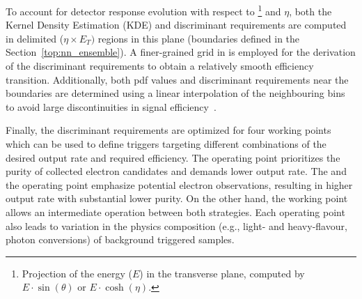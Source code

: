 To account for detector response evolution with
respect to \Et\footnote{Projection of the energy ($E$) in the transverse plane,
computed by $E\cdot\sin(\theta)$ or $E\cdot\cosh(\eta)$.} and
$\eta$, both the Kernel Density Estimation (KDE) and discriminant requirements are computed in delimited ($\eta\times E_{T})$
regions in this plane (boundaries defined in the Section~\ref{top:nn_ensemble}).
A finer-grained grid in \Et is employed for the derivation of the discriminant
requirements to obtain a relatively smooth efficiency transition. Additionally,
both pdf values and discriminant requirements near the boundaries are determined
using a linear interpolation of the neighbouring bins to avoid large
discontinuities in signal efficiency~\cite{aaboud2019electron}.

Finally, the discriminant requirements are optimized for four working points
which can be used to define triggers targeting different combinations of the desired output rate
and required efficiency. The \tight{} operating point prioritizes the purity of
collected electron candidates and demands lower output rate.
The \loose{} and the \vloose{} operating point emphasize potential electron observations, resulting in higher output rate with substantial lower purity. 
On the other hand, the \medium{} working point allows an intermediate
operation between both strategies. Each operating point also leads to
variation in the physics composition (e.g., light- and heavy-flavour, photon
conversions) of background triggered samples. 








